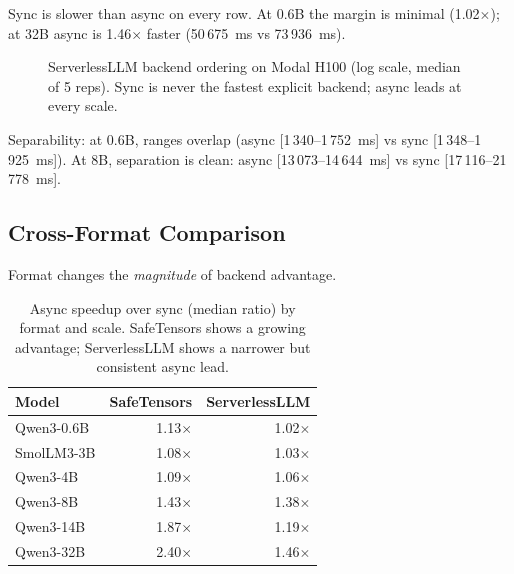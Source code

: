 Sync is slower than async on every row. At 0.6B the margin is minimal (1.02$\times$); at 32B async is 1.46$\times$ faster (50\,675~ms vs 73\,936~ms).



\begin{figure}[htbp]
    \centering
    \caption{ServerlessLLM backend ordering on Modal H100 (log scale, median of 5 reps). Sync is never the fastest explicit backend; async leads at every scale.}
    \label{fig:serverlessllm-crossover}
\end{figure}

Separability: at 0.6B, ranges overlap (async [1\,340--1\,752~ms] vs sync [1\,348--1\,925~ms]). At 8B, separation is clean: async [13\,073--14\,644~ms] vs sync [17\,116--21\,778~ms].

\subsection{Cross-Format Comparison}

Format changes the \emph{magnitude} of backend advantage.

\begin{table}[htbp]
\caption{Async speedup over sync (median ratio) by format and scale. SafeTensors shows a growing advantage; ServerlessLLM shows a narrower but consistent async lead.}
\label{tab:cross-format}
\centering
\begin{tabular}{lrr}
\toprule
Model & SafeTensors & ServerlessLLM \\
\midrule
Qwen3-0.6B & 1.13$\times$ & 1.02$\times$ \\
SmolLM3-3B & 1.08$\times$ & 1.03$\times$ \\
Qwen3-4B & 1.09$\times$ & 1.06$\times$ \\
Qwen3-8B & 1.43$\times$ & 1.38$\times$ \\
Qwen3-14B & 1.87$\times$ & 1.19$\times$ \\
Qwen3-32B & 2.40$\times$ & 1.46$\times$ \\
\bottomrule
\end{tabular}
\end{table}

